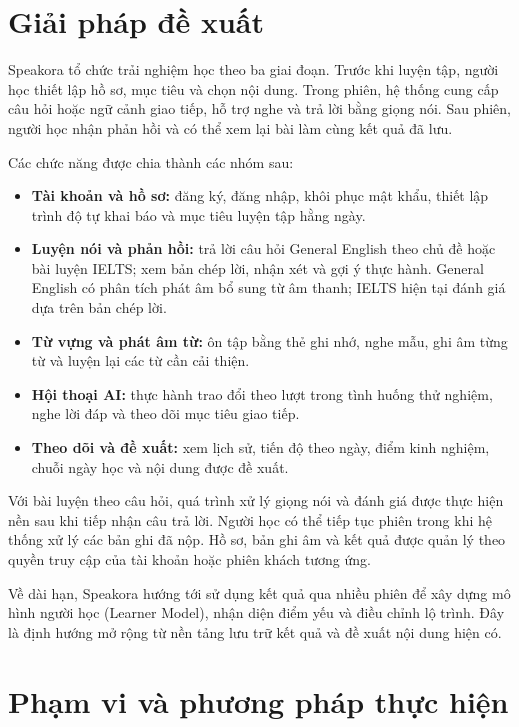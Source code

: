 \documentclass[12pt,a4paper,oneside]{report}
\begin{document}
\section{Giải pháp đề xuất}

Speakora tổ chức trải nghiệm học theo ba giai đoạn. Trước khi luyện tập, người học thiết lập hồ sơ, mục tiêu và chọn nội dung. Trong phiên, hệ thống cung cấp câu hỏi hoặc ngữ cảnh giao tiếp, hỗ trợ nghe và trả lời bằng giọng nói. Sau phiên, người học nhận phản hồi và có thể xem lại bài làm cùng kết quả đã lưu.

Các chức năng được chia thành các nhóm sau:
\begin{itemize}
    \item \textbf{Tài khoản và hồ sơ:} đăng ký, đăng nhập, khôi phục mật khẩu, thiết lập trình độ tự khai báo và mục tiêu luyện tập hằng ngày.
    \item \textbf{Luyện nói và phản hồi:} trả lời câu hỏi General English theo chủ đề hoặc bài luyện IELTS; xem bản chép lời, nhận xét và gợi ý thực hành. General English có phân tích phát âm bổ sung từ âm thanh; IELTS hiện tại đánh giá dựa trên bản chép lời.
    \item \textbf{Từ vựng và phát âm từ:} ôn tập bằng thẻ ghi nhớ, nghe mẫu, ghi âm từng từ và luyện lại các từ cần cải thiện.
    \item \textbf{Hội thoại AI:} thực hành trao đổi theo lượt trong tình huống thử nghiệm, nghe lời đáp và theo dõi mục tiêu giao tiếp.
    \item \textbf{Theo dõi và đề xuất:} xem lịch sử, tiến độ theo ngày, điểm kinh nghiệm, chuỗi ngày học và nội dung được đề xuất.
\end{itemize}

Với bài luyện theo câu hỏi, quá trình xử lý giọng nói và đánh giá được thực hiện nền sau khi tiếp nhận câu trả lời. Người học có thể tiếp tục phiên trong khi hệ thống xử lý các bản ghi đã nộp. Hồ sơ, bản ghi âm và kết quả được quản lý theo quyền truy cập của tài khoản hoặc phiên khách tương ứng.

Về dài hạn, Speakora hướng tới sử dụng kết quả qua nhiều phiên để xây dựng mô hình người học (Learner Model), nhận diện điểm yếu và điều chỉnh lộ trình. Đây là định hướng mở rộng từ nền tảng lưu trữ kết quả và đề xuất nội dung hiện có.

\section{Phạm vi và phương pháp thực hiện}
\end{document}
